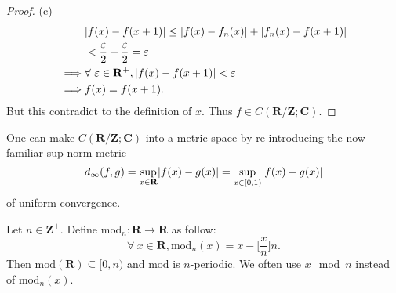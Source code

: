 \begin{proof}{(c)}
\begin{align*}
                 & \abs*{f(x) - f(x + 1)} \leq \abs*{f(x) - f_n(x)} + \abs*{f_n(x) - f(x + 1)}                                                                           \\
                 & < \frac{\varepsilon}{2} + \frac{\varepsilon}{2} = \varepsilon                                                                                         \\
        \implies & \forall\ \varepsilon \in \mathbf{R}^+, \abs*{f(x) - f(x + 1)} < \varepsilon                                                                           \\
        \implies & f(x) = f(x + 1).
    \end{align*}
    But this contradict to the definition of \(x\).
    Thus \(f \in C(\mathbf{R} / \mathbf{Z} ; \mathbf{C})\).
\end{proof}

\begin{note}
    One can make \(C(\mathbf{R} / \mathbf{Z} ; \mathbf{C})\) into a metric space by re-introducing the now familiar sup-norm metric
    \[
        d_\infty(f, g) = \sup_{x \in \mathbf{R}} \abs*{f(x) - g(x)} = \sup_{x \in [0, 1)} \abs*{f(x) - g(x)}
    \]
    of uniform convergence.
\end{note}

\begin{additional corollary}\label{ac 5.1.1}
Let \(n \in \mathbf{Z}^+\).
Define \(\text{mod}_n : \mathbf{R} \to \mathbf{R}\) as follow:
\[
    \forall\ x \in \mathbf{R}, \text{mod}_n(x) = x - \bigg[\frac{x}{n}\bigg] n.
\]
Then \(\text{mod}(\mathbf{R}) \subseteq [0, n)\) and \(\text{mod}\) is \(n\)-periodic.
We often use \(x \mod n\) instead of \(\text{mod}_n(x)\).
\end{additional corollary}

